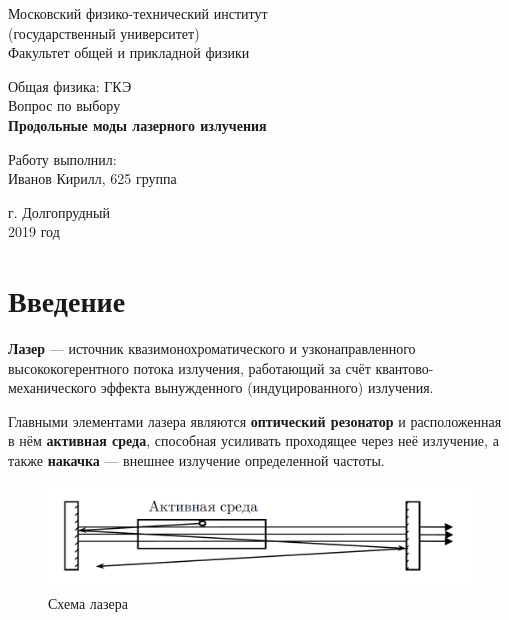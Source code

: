 \documentclass[12pt]{kiarticle}
\begin{document}
	
	\begin{titlepage}
	\begin{center}
		\large 	Московский физико-технический институт \\
		(государственный университет) \\
		Факультет общей и прикладной физики \\
		\vspace{0.2cm}
		
		\vspace{4.5cm}
		\Large{Общая физика: ГКЭ \\ \vspace{0.2cm}
			Вопрос по выбору} \\ \vspace{0.2cm}
		\LARGE \textbf{Продольные моды лазерного излучения}
	\end{center}
	\vspace{2.3cm} \large
	
	\begin{center}
		Работу выполнил: \\
		Иванов Кирилл,
		625 группа
		\vspace{10mm}		
		
	\end{center}
	
	\begin{center} \vspace{60mm}
		г. Долгопрудный \\
		2019 год
	\end{center}
\end{titlepage}



\section{Введение}

\textbf{Лазер} ---  источник квазимонохроматического и узконаправленного высококогерентного потока излучения, работающий за счёт квантово-механического эффекта вынужденного (индуцированного) излучения.

Главными элементами лазера являются \textbf{оптический резонатор} и расположенная в нём \textbf{активная среда}, способная усиливать проходящее через неё излучение, а также \textbf{накачка} --- внешнее излучение определенной частоты. 

\begin{figure}[h!]
	\centering
	\includegraphics[width=0.7\linewidth]{laser.png}
	\caption{Схема лазера}
	\label{laser}
\end{figure}
\end{document}
